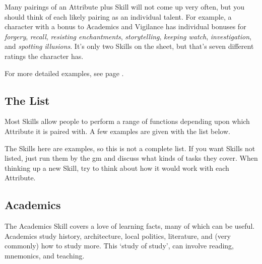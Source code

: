 \begin{multicols}{2}
Many pairings of an Attribute plus Skill will not come up very often, but you should think of each likely pairing as an individual talent.
For example, a character with a bonus to Academics and Vigilance has individual bonuses for \textit{forgery}, \textit{recall}, \textit{resisting enchantments}, \textit{storytelling}, \textit{keeping watch}, \textit{investigation}, and \textit{spotting illusions}.
It's only two Skills on the sheet, but that's seven different ratings the character has.

For more detailed examples, see page \pageref{skill_uses}.

\label{skills}
\subsection{The List}

Most Skills allow people to perform a range of functions depending upon which Attribute it is paired with. A few examples are given with the list below.

The Skills here are examples, so this is not a complete list.
If you want Skills not listed, just run them by the \gls{gm} and discuss what kinds of tasks they cover.
When thinking up a new Skill, try to think about how it would work with each Attribute.

\subsection{Academics}

The Academics Skill covers a love of learning facts, many of which can be useful.
Academics study history, architecture, local politics, literature, and (very commonly) how to study more.
This `study of study', can involve reading, mnemonics, and teaching.

\end{multicols}
